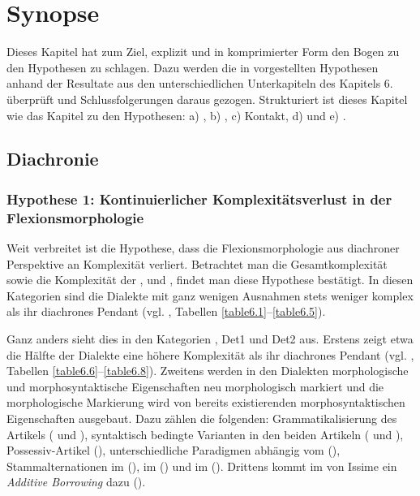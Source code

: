 \section{Synopse}\label{6.6}

Dieses Kapitel hat zum Ziel, explizit und in komprimierter Form den Bogen zu den Hypothesen zu schlagen. Dazu werden die in  vorgestellten Hypothesen anhand der Resultate aus den unterschiedlichen Unterkapiteln des Kapitels 6. überprüft und Schlussfolgerungen daraus gezogen. Strukturiert ist dieses Kapitel wie das Kapitel  zu den Hypothesen: a) , b) , c) Kontakt, d)  und e) .

\subsection{Diachronie}\label{6.6.1}

\subsubsection{Hypothese 1: Kontinuierlicher Komplexitätsverlust in der Flexionsmorphologie}

Weit verbreitet ist die Hypothese, dass die Flexionsmorphologie aus diachroner Perspektive an Komplexität verliert. Betrachtet man die Gesamtkomplexität sowie die Komplexität der ,  und , findet man diese Hypothese bestätigt. In diesen Kategorien sind die Dialekte mit ganz wenigen Ausnahmen stets weniger komplex als ihr diachrones Pendant (vgl. , Tabellen \ref{table6.1}–\ref{table6.5}).

Ganz anders sieht dies in den Kategorien , Det1 und Det2 aus. Erstens zeigt etwa die Hälfte der Dialekte eine höhere Komplexität als ihr diachrones Pendant (vgl. , Tabellen \ref{table6.6}–\ref{table6.8}). Zweitens werden in den Dialekten morphologische und morphosyntaktische Eigenschaften neu morphologisch markiert und die morphologische Markierung wird von bereits existierenden morphosyntaktischen Eigenschaften ausgebaut. Dazu zählen die folgenden: Grammatikalisierung des Artikels ( und ), syntaktisch bedingte Varianten in den beiden Artikeln ( und ), Possessiv-Artikel (), unterschiedliche Paradigmen abhängig vom  (), Stammalternationen im  (),  im  () und  im  (). Drittens kommt im  von Issime ein \textit{Additive Borrowing} dazu ().

